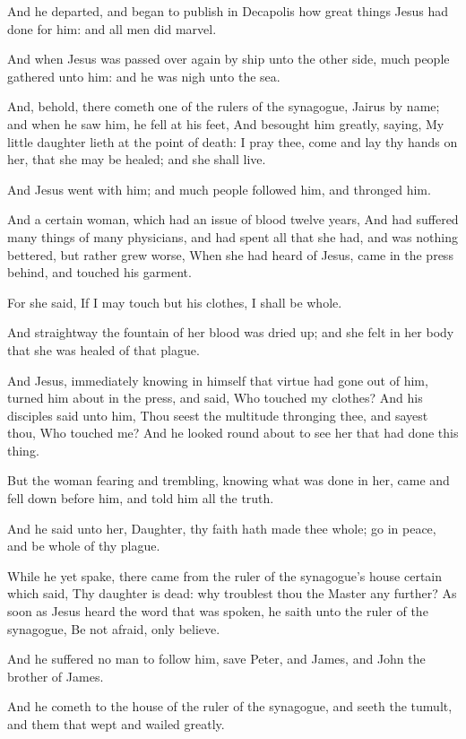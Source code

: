 \Verse And he departed, and began to publish in Decapolis how great things Jesus had done for him: and all men did marvel.

\Verse And when Jesus was passed over again by ship unto the other side, much people gathered unto him: and he was nigh unto the sea.

\Verse And, behold, there cometh one of the rulers of the synagogue, Jairus by name; and when he saw him, he fell at his feet, \Verse And besought him greatly, saying, My little daughter lieth at the point of death: I pray thee, come and lay thy hands on her, that she may be healed; and she shall live.

\Verse And Jesus went with him; and much people followed him, and thronged him.

\Verse And a certain woman, which had an issue of blood twelve years, \Verse And had suffered many things of many physicians, and had spent all that she had, and was nothing bettered, but rather grew worse, \Verse When she had heard of Jesus, came in the press behind, and touched his garment.

\Verse For she said, If I may touch but his clothes, I shall be whole.

\Verse And straightway the fountain of her blood was dried up; and she felt in her body that she was healed of that plague.

\Verse And Jesus, immediately knowing in himself that virtue had gone out of him, turned him about in the press, and said, Who touched my clothes?  \Verse And his disciples said unto him, Thou seest the multitude thronging thee, and sayest thou, Who touched me?  \Verse And he looked round about to see her that had done this thing.

\Verse But the woman fearing and trembling, knowing what was done in her, came and fell down before him, and told him all the truth.

\Verse And he said unto her, Daughter, thy faith hath made thee whole; go in peace, and be whole of thy plague.

\Verse While he yet spake, there came from the ruler of the synagogue's house certain which said, Thy daughter is dead: why troublest thou the Master any further?  \Verse As soon as Jesus heard the word that was spoken, he saith unto the ruler of the synagogue, Be not afraid, only believe.

\Verse And he suffered no man to follow him, save Peter, and James, and John the brother of James.

\Verse And he cometh to the house of the ruler of the synagogue, and seeth the tumult, and them that wept and wailed greatly.

